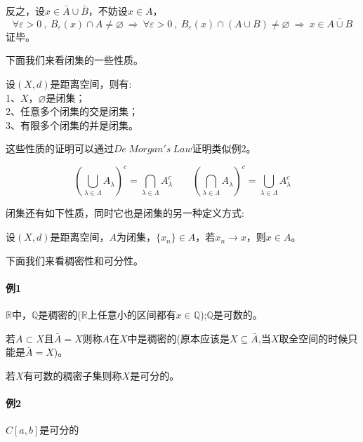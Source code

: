 反之，设$x \in \bar{A} \cup \bar{B}$，不妨设$x \in A$，
\[\forall \varepsilon>0 \ , \ B_{\varepsilon}(x) \cap A \neq \varnothing \ \Rightarrow \ \forall \varepsilon>0 \ , \ B_{\varepsilon}(x) \cap (A \cup B) \neq \varnothing \ \Rightarrow  \ x \in \overline{A \cup B}\]
证毕。

下面我们来看闭集的一些性质。
\begin{theorem}
    设$(X,d)$是距离空间，则有:\\
    1、$X$，$\varnothing$是闭集；\\
    2、任意多个闭集的交是闭集；\\
    3、有限多个闭集的并是闭集。
\end{theorem}

这些性质的证明可以通过$De \ Morgan's \ Law$证明类似例2。
\begin{theorem}
\[\left(\bigcup\limits_{\lambda \in \Lambda}A_{\lambda}\right)^c=\bigcap\limits_{\lambda \in \Lambda}A_{\lambda}^c \qquad \left(\bigcap\limits_{\lambda \in \Lambda}A_{\lambda}\right)^c=\bigcup\limits_{\lambda \in \Lambda}A_{\lambda}^c\]
\end{theorem}

闭集还有如下性质，同时它也是闭集的另一种定义方式:
\begin{theorem}
    设$(X,d)$是距离空间，$A$为闭集，$\{x_n\} \in A$，若$x_n \rightarrow x$，则$x \in A$。
\end{theorem}

下面我们来看稠密性和可分性。

\paragraph*{例1} \quad $\mathbb{R}$中，$\mathbb{Q}$是稠密的($\mathbb{R}$上任意小的区间都有$x \in \mathbb{Q}$);$\mathbb{Q}$是可数的。
\begin{definition}[稠密性]
    若$A \subset X$且$\bar{A}=X$则称$A$在$X$中是稠密的(原本应该是$X \subseteq \bar{A}$,当$X$取全空间的时候只能是$\bar{A}=X$)。
\end{definition}
\begin{definition}[可分性]
    若$X$有可数的稠密子集则称$X$是可分的。
\end{definition}
\paragraph*{例2} \quad $C[a,b]$是可分的

